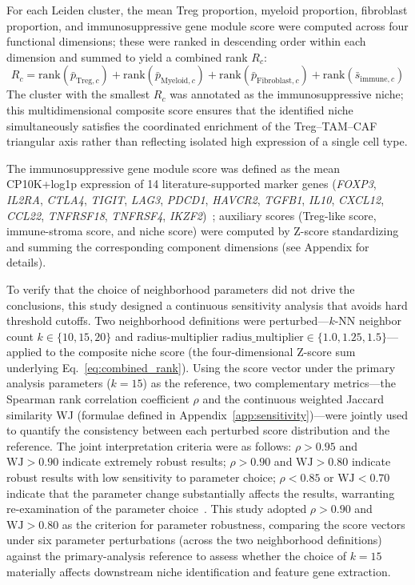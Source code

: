 \documentclass[12pt, a4paper]{article}
\begin{document}
For each Leiden cluster, the mean Treg proportion, myeloid proportion, fibroblast proportion, and immunosuppressive gene module score were computed across four functional dimensions; these were ranked in descending order within each dimension and summed to yield a combined rank $R_c$:
\begin{equation}
R_c = \text{rank}(\bar{p}_{\text{Treg},c}) + \text{rank}(\bar{p}_{\text{Myeloid},c})
+ \text{rank}(\bar{p}_{\text{Fibroblast},c}) + \text{rank}(\bar{s}_{\text{immune},c})
\label{eq:combined_rank}
\end{equation}
The cluster with the smallest $R_c$ was annotated as the immunosuppressive niche; this multidimensional composite score ensures that the identified niche simultaneously satisfies the coordinated enrichment of the Treg--TAM--CAF triangular axis rather than reflecting isolated high expression of a single cell type.

The immunosuppressive gene module score was defined as the mean CP10K+log1p expression of 14 literature-supported marker genes (\textit{FOXP3}, \textit{IL2RA}, \textit{CTLA4}, \textit{TIGIT}, \textit{LAG3}, \textit{PDCD1}, \textit{HAVCR2}, \textit{TGFB1}, \textit{IL10}, \textit{CXCL12}, \textit{CCL22}, \textit{TNFRSF18}, \textit{TNFRSF4}, \textit{IKZF2})~\citep{sakaguchi2020regulatory,sharma2023immunosuppressive}; auxiliary scores (Treg-like score, immune-stroma score, and niche score) were computed by Z-score standardizing and summing the corresponding component dimensions (see Appendix for details).

To verify that the choice of neighborhood parameters did not drive the conclusions, this study designed a continuous sensitivity analysis that avoids hard threshold cutoffs. Two neighborhood definitions were perturbed—$k$-NN neighbor count $k \in \{10, 15, 20\}$ and radius-multiplier $\text{radius\_multiplier} \in \{1.0, 1.25, 1.5\}$—applied to the composite niche score (the four-dimensional Z-score sum underlying Eq.~\ref{eq:combined_rank}). Using the score vector under the primary analysis parameters ($k=15$) as the reference, two complementary metrics—the Spearman rank correlation coefficient $\rho$ and the continuous weighted Jaccard similarity WJ (formulae defined in Appendix~\ref{app:sensitivity})—were jointly used to quantify the consistency between each perturbed score distribution and the reference. The joint interpretation criteria were as follows: $\rho > 0.95$ and $\text{WJ} > 0.90$ indicate extremely robust results; $\rho > 0.90$ and $\text{WJ} > 0.80$ indicate robust results with low sensitivity to parameter choice; $\rho < 0.85$ or $\text{WJ} < 0.70$ indicate that the parameter change substantially affects the results, warranting re-examination of the parameter choice~\citep{spearman1904proof}. This study adopted $\rho > 0.90$ and $\text{WJ} > 0.80$ as the criterion for parameter robustness, comparing the score vectors under six parameter perturbations (across the two neighborhood definitions) against the primary-analysis reference to assess whether the choice of $k=15$ materially affects downstream niche identification and feature gene extraction.
\end{document}
